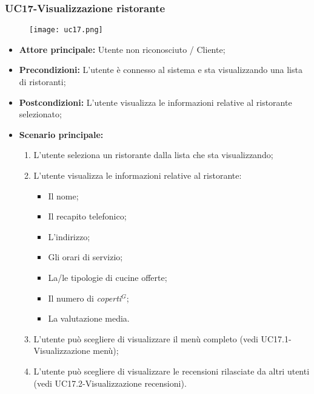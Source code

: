 \subsubsection{UC17-Visualizzazione ristorante}
\begin{figure}[h] \texttt{[image: uc17.png]} \end{figure}
\begin{itemize}
\item \textbf{Attore principale:} Utente non riconosciuto / Cliente;
\item \textbf{Precondizioni:} L'utente è connesso al sistema e sta visualizzando una lista di ristoranti;
\item \textbf{Postcondizioni:} L'utente visualizza le informazioni relative al ristorante selezionato;
\item \textbf{Scenario principale:}
\begin{enumerate}
    \item L'utente seleziona un ristorante dalla lista che sta visualizzando;
    \item L'utente visualizza le informazioni relative al ristorante:
    \begin{itemize}
        \item Il nome;
        \item Il recapito telefonico;
        \item L'indirizzo;
        \item Gli orari di servizio;
        \item La/le tipologie di cucine offerte;
        \item Il numero di \emph{coperti}$^{G}$;
        \item La valutazione media.
    \end{itemize}
    \item L'utente può scegliere di visualizzare il menù completo (vedi UC17.1-Visualizzazione menù);
    \item L'utente può scegliere di visualizzare le recensioni rilasciate da altri utenti (vedi UC17.2-Visualizzazione recensioni).
\end{enumerate}
\end{itemize}

